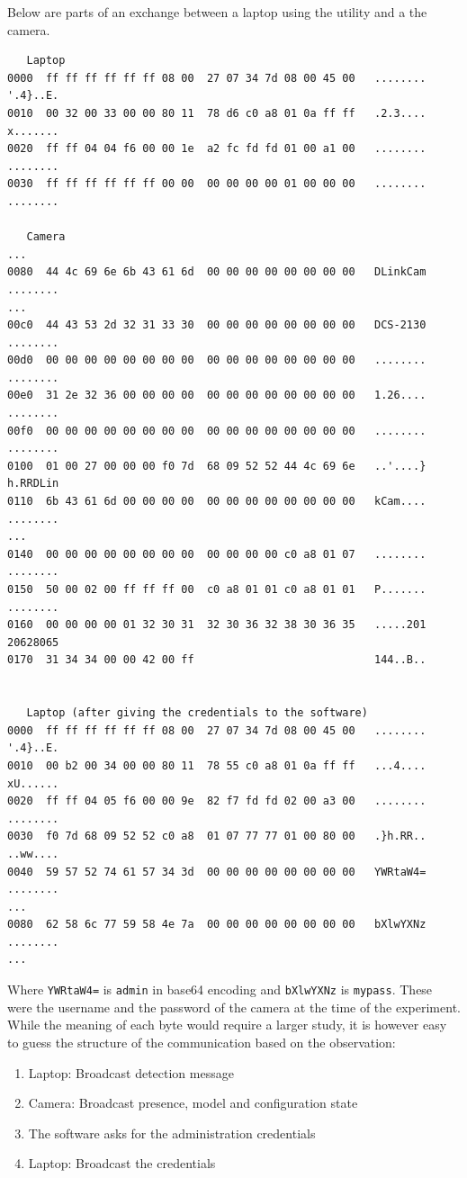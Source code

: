 Below are parts of an exchange between a laptop using the utility and a the camera.

{\scriptsize
\begin{verbatim}
   Laptop
0000  ff ff ff ff ff ff 08 00  27 07 34 7d 08 00 45 00   ........ '.4}..E.
0010  00 32 00 33 00 00 80 11  78 d6 c0 a8 01 0a ff ff   .2.3.... x.......
0020  ff ff 04 04 f6 00 00 1e  a2 fc fd fd 01 00 a1 00   ........ ........
0030  ff ff ff ff ff ff 00 00  00 00 00 00 01 00 00 00   ........ ........

   Camera
...
0080  44 4c 69 6e 6b 43 61 6d  00 00 00 00 00 00 00 00   DLinkCam ........
...
00c0  44 43 53 2d 32 31 33 30  00 00 00 00 00 00 00 00   DCS-2130 ........
00d0  00 00 00 00 00 00 00 00  00 00 00 00 00 00 00 00   ........ ........
00e0  31 2e 32 36 00 00 00 00  00 00 00 00 00 00 00 00   1.26.... ........
00f0  00 00 00 00 00 00 00 00  00 00 00 00 00 00 00 00   ........ ........
0100  01 00 27 00 00 00 f0 7d  68 09 52 52 44 4c 69 6e   ..'....} h.RRDLin
0110  6b 43 61 6d 00 00 00 00  00 00 00 00 00 00 00 00   kCam.... ........
...
0140  00 00 00 00 00 00 00 00  00 00 00 00 c0 a8 01 07   ........ ........
0150  50 00 02 00 ff ff ff 00  c0 a8 01 01 c0 a8 01 01   P....... ........
0160  00 00 00 00 01 32 30 31  32 30 36 32 38 30 36 35   .....201 20628065
0170  31 34 34 00 00 42 00 ff                            144..B..         


   Laptop (after giving the credentials to the software)
0000  ff ff ff ff ff ff 08 00  27 07 34 7d 08 00 45 00   ........ '.4}..E.
0010  00 b2 00 34 00 00 80 11  78 55 c0 a8 01 0a ff ff   ...4.... xU......
0020  ff ff 04 05 f6 00 00 9e  82 f7 fd fd 02 00 a3 00   ........ ........
0030  f0 7d 68 09 52 52 c0 a8  01 07 77 77 01 00 80 00   .}h.RR.. ..ww....
0040  59 57 52 74 61 57 34 3d  00 00 00 00 00 00 00 00   YWRtaW4= ........
...
0080  62 58 6c 77 59 58 4e 7a  00 00 00 00 00 00 00 00   bXlwYXNz ........
...
\end{verbatim}
  }


Where \texttt{YWRtaW4=} is \texttt{admin} in base64 encoding and \texttt{bXlwYXNz} is \texttt{mypass}.
These were the username and the password of the camera at the time of the experiment.
While the meaning of each byte would require a larger study, it is however easy to guess the structure of the communication based on the observation:

\begin{enumerate}
\item Laptop: Broadcast detection message
\item Camera: Broadcast presence, model and configuration state
\item The software asks for the administration credentials
\item Laptop: Broadcast the credentials
\end{enumerate}

